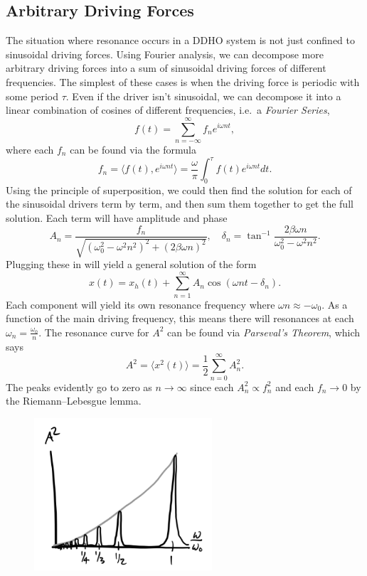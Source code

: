 \documentclass[
  letterpaper,
  DIV=11,
  numbers=noendperiod]{scrreprt}
\begin{document}
\hypertarget{arbitrary-driving-forces}{%
\subsection{Arbitrary Driving Forces}\label{arbitrary-driving-forces}}

The situation where resonance occurs in a DDHO system is not just
confined to sinusoidal driving forces. Using Fourier analysis, we can
decompose more arbitrary driving forces into a sum of sinusoidal driving
forces of different frequencies. The simplest of these cases is when the
driving force is periodic with some period \(\tau\). Even if the driver
isn't sinusoidal, we can decompose it into a linear combination of
cosines of different frequencies, i.e.~a \emph{Fourier Series}, \[
f(t) = \sum_{n=-\infty}^{\infty} f_n e^{i \omega n t},
\] where each \(f_n\) can be found via the formula \[
f_n = \langle f(t), e^{i \omega n t} \rangle = \frac{\omega}{\pi} \int_0^{\tau} f(t) e^{i \omega n t} dt.
\] Using the principle of superposition, we could then find the solution
for each of the sinusoidal drivers term by term, and then sum them
together to get the full solution. Each term will have amplitude and
phase \[
A_n = \frac{f_n}{\sqrt{(\omega_0^2-\omega^2 n^2)^2 + (2\beta\omega n)^2}}, \quad \delta_n = \tan^{-1} \frac{2\beta\omega n}{\omega_0^2-\omega^2n^2}.
\] Plugging these in will yield a general solution of the form \[
x(t) = x_h(t) + \sum_{n=1}^{\infty} A_n \cos(\omega n t - \delta_n).
\] Each component will yield its own resonance frequency where
\(\omega n \approx -\omega_0\). As a function of the main driving
frequency, this means there will resonances at each
\(\omega_n = \frac{\omega_0}{n}\). The resonance curve for \(A^2\) can
be found via \emph{Parseval's Theorem}, which says \[
A^2 = \langle x^2(t) \rangle = \frac{1}{2} \sum_{n=0}^\infty A_n^2.
\] The peaks evidently go to zero as \(n \rightarrow \infty\) since each
\(A_n^2 \propto f_n^2\) and each \(f_n \rightarrow 0\) by the
Riemann--Lebesgue lemma.

\begin{figure}

{\centering \includegraphics[width=2.60417in,height=\textheight]{classical-mechanics/./resources/image-20230215160201364.png}

}

\end{figure}
\end{document}
